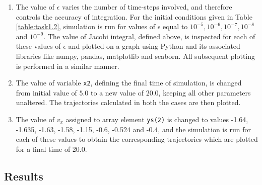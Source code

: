 \documentclass[a4paper]{article}
\begin{document}
\begin{enumerate}
			\item The value of \(\epsilon\) varies the number of time-steps involved, and therefore controls the accuracy of integration. For the initial conditions given in Table \ref{table:task1.2}, simulation is run for values of \(\epsilon\) equal to \(10^{-5}, 10^{-6}, 10^{-7}, 10^{-8}\) and \(10^{-9}\). The value of Jacobi integral, defined above, is inspected for each of these values of \(\epsilon\) and plotted on a graph using Python and its associated libraries like numpy, pandas, matplotlib and seaborn. All subsequent plotting is performed in a similar manner.
			
			\item The value of variable \texttt{x2}, defining the final time of simulation, is changed from initial value of \(5.0\) to a new value of \(20.0\), keeping all other parameters unaltered. The trajectories calculated in both the cases are then plotted.
			
			\item The value of \(v_x\) assigned to array element \texttt{ys(2)} is changed to values -1.64, -1.635, -1.63, -1.58, -1.15, -0.6, -0.524 and -0.4, and the simulation is run for each of these values to obtain the corresponding trajectories which are plotted for a final time of 20.0.
			
		\end{enumerate}
		
		
		\subsection{Results} \label{results1}
		
\end{document}
